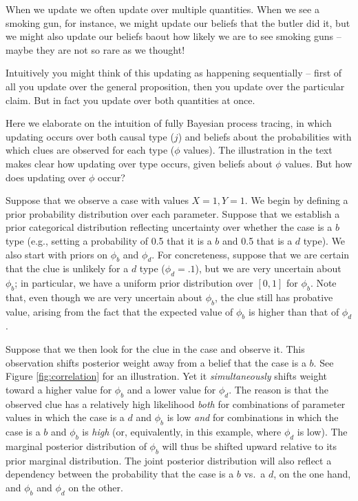 \documentclass[12pt,]{book}
\begin{document}
When we update we often update over multiple quantities. When we see a smoking gun, for instance, we might update our beliefs that the butler did it, but we might also update our beliefs baout how likely we are to see smoking guns -- maybe they are not so rare as we thought!

Intuitively you might think of this updating as happening sequentially -- first of all you update over the general proposition, then you update over the particular claim. But in fact you update over both quantities at once.

Here we elaborate on the intuition of fully Bayesian process tracing, in which updating occurs over both causal type (\(j\)) and beliefs about the probabilities with which clues are observed for each type (\(\phi\) values). The illustration in the text makes clear how updating over type occurs, given beliefs about \(\phi\) values. But how does updating over \(\phi\) occur?

Suppose that we observe a case with values \(X=1, Y=1\). We begin by defining a prior probability distribution over each parameter. Suppose that we establish a prior categorical distribution reflecting uncertainty over whether the case is a \(b\) type (e.g., setting a probability of 0.5 that it is a \(b\) and 0.5 that is a \(d\) type). We also start with priors on \(\phi_b\) and \(\phi_d\). For concreteness, suppose that we are certain that the clue is unlikely for a \(d\) type (\(\phi_d=.1\)), but we are very uncertain about \(\phi_b\); in particular, we have a uniform prior distribution over \([0,1]\) for \(\phi_b\). Note that, even though we are very uncertain about \(\phi_b\), the clue still has probative value, arising from the fact that the expected value of \(\phi_b\) is higher than that of \(\phi_d\).

Suppose that we then look for the clue in the case and observe it. This observation shifts posterior weight away from a belief that the case is a \(b\). See Figure \ref{fig:correlation} for an illustration. Yet it \emph{simultaneously} shifts weight toward a higher value for \(\phi_b\) and a lower value for \(\phi_d\). The reason is that the observed clue has a relatively high likelihood \emph{both} for combinations of parameter values in which the case is a \(d\) and \(\phi_b\) is low \emph{and} for combinations in which the case is a \(b\) and \(\phi_b\) is \emph{high} (or, equivalently, in this example, where \(\phi_d\) is low). The marginal posterior distribution of \(\phi_b\) will thus be shifted upward relative to its prior marginal distribution. The joint posterior distribution will also reflect a dependency between the probability that the case is a \(b\) vs.~a \(d\), on the one hand, and \(\phi_b\) and \(\phi_d\) on the other.
\end{document}
